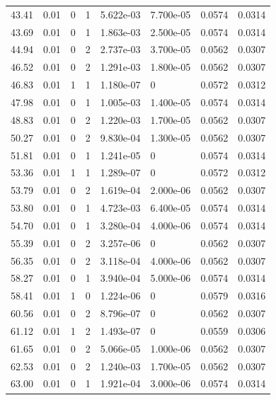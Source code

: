 \documentclass[preview]{standalone}
\begin{document}
{{{\begin{tabular}{L{1.2cm}C{1.2cm} C{0.3cm}C{0.5cm} C{1.4cm}C{1.4cm} C{1.4cm}C{1.4cm}}
  43.41  &  0.01  & 0     &  1 &  5.622e-03  & 7.700e-05  & 0.0574 &  0.0314   \\ 
  43.69  &  0.01  & 0     &  1 &  1.863e-03  & 2.500e-05  & 0.0574 &  0.0314   \\ 
  44.94  &  0.01  & 0     &  2 &  2.737e-03  & 3.700e-05  & 0.0562 &  0.0307   \\ 
  46.52  &  0.01  & 0     &  2 &  1.291e-03  & 1.800e-05  & 0.0562 &  0.0307   \\ 
  46.83  &  0.01  & 1     &  1 &  1.180e-07  & 0  & 0.0572 &  0.0312   \\ 
  47.98  &  0.01  & 0     &  1 &  1.005e-03  & 1.400e-05  & 0.0574 &  0.0314   \\ 
  48.83  &  0.01  & 0     &  2 &  1.220e-03  & 1.700e-05  & 0.0562 &  0.0307   \\ 
  50.27  &  0.01  & 0     &  2 &  9.830e-04  & 1.300e-05  & 0.0562 &  0.0307   \\ 
  51.81  &  0.01  & 0     &  1 &  1.241e-05  & 0  & 0.0574 &  0.0314   \\ 
  53.36  &  0.01  & 1     &  1 &  1.289e-07  & 0  & 0.0572 &  0.0312   \\ 
  53.79  &  0.01  & 0     &  2 &  1.619e-04  & 2.000e-06  & 0.0562 &  0.0307   \\ 
  53.80  &  0.01  & 0     &  1 &  4.723e-03  & 6.400e-05  & 0.0574 &  0.0314   \\ 
  54.70  &  0.01  & 0     &  1 &  3.280e-04  & 4.000e-06  & 0.0574 &  0.0314   \\ 
  55.39  &  0.01  & 0     &  2 &  3.257e-06  & 0  & 0.0562 &  0.0307   \\ 
  56.35  &  0.01  & 0     &  2 &  3.118e-04  & 4.000e-06  & 0.0562 &  0.0307   \\ 
  58.27  &  0.01  & 0     &  1 &  3.940e-04  & 5.000e-06  & 0.0574 &  0.0314   \\ 
  58.41  &  0.01  & 1     &  0 &  1.224e-06  & 0  & 0.0579 &  0.0316   \\ 
  60.56  &  0.01  & 0     &  2 &  8.796e-07  & 0  & 0.0562 &  0.0307   \\ 
  61.12  &  0.01  & 1     &  2 &  1.493e-07  & 0  & 0.0559 &  0.0306   \\ 
  61.65  &  0.01  & 0     &  2 &  5.066e-05  & 1.000e-06  & 0.0562 &  0.0307   \\ 
  62.53  &  0.01  & 0     &  2 &  1.240e-03  & 1.700e-05  & 0.0562 &  0.0307   \\ 
  63.00  &  0.01  & 0     &  1 &  1.921e-04  & 3.000e-06  & 0.0574 &  0.0314   \\ 

\end{tabular}}}}
\end{document}
